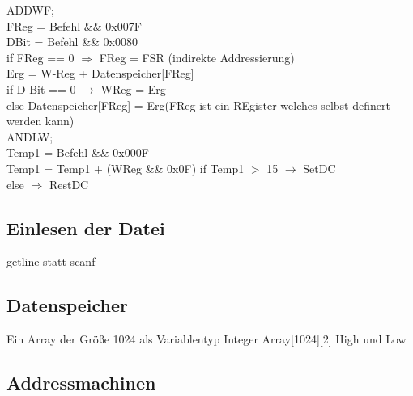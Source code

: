 ADDWF;\\
FReg = Befehl \&\& 0x007F\\
DBit = Befehl \&\& 0x0080\\
if FReg == 0 $\Longrightarrow$ FReg = FSR (indirekte Addressierung)\\
Erg = W-Reg + Datenspeicher[FReg]\\
if D-Bit == 0 $\longrightarrow$ WReg = Erg\\
else Datenspeicher[FReg] = Erg(FReg ist ein REgister welches selbst definert werden kann)\\ 

ANDLW;\\



Temp1 = Befehl \&\& 0x000F\\
Temp1 = Temp1 + (WReg \&\& 0x0F)
if Temp1 $>$ 15 $\longrightarrow$ SetDC\\
else $\Longrightarrow$ RestDC


\subsection{Einlesen der Datei}
getline statt scanf

\subsection{Datenspeicher}
Ein Array der Größe 1024 als Variablentyp Integer
Array[1024][2] High und Low

\subsection{Addressmachinen}


